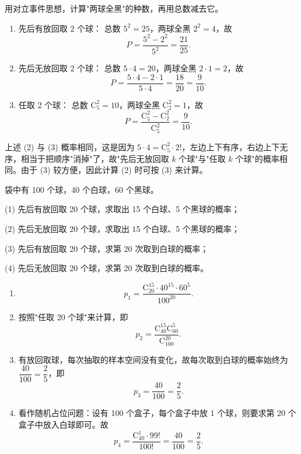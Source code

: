 \documentclass[lang=cn,11pt]{elegantbook}
\begin{document}
\begin{solution}
用对立事件思想，计算"两球全黑"的种数，再用总数减去它。
\begin{enumerate}
    \item 先后有放回取 2 个球：
    总数 \(5^2 = 25\)，两球全黑 \(2^2 = 4\)，故
    \[
    P = \frac{5^2 - 2^2}{5^2} = \frac{21}{25}.
    \]
    \item 先后无放回取 2 个球：
    总数 \(5 \cdot 4 = 20\)，两球全黑 \(2 \cdot 1 = 2\)，故
    \[
    P = \frac{5 \cdot 4 - 2 \cdot 1}{5 \cdot 4} = \frac{18}{20} = \frac{9}{10}.
    \]
    \item 任取 2 个球：
    总数 \(\mathrm{C}_5^2 = 10\)，两球全黑 \(\mathrm{C}_2^2 = 1\)，故
    \[
    P = \frac{\mathrm{C}_5^2 - \mathrm{C}_2^2}{\mathrm{C}_5^2} = \frac{9}{10}.
    \]
\end{enumerate}
\end{solution}

\begin{note}
上述 (2) 与 (3) 概率相同，这是因为 \(5 \cdot 4 = \mathrm{C}_5^2 \cdot 2!\)，左边上下有序，右边上下无序，相当于把顺序"消掉"了，故"先后无放回取 \(k\) 个球"与"任取 \(k\) 个球"的概率相同。由于 (3) 较方便，因此计算 (2) 时可按 (3) 来计算。
\end{note}

\begin{exercise}\label{exer:1-6}
袋中有 100 个球，40 个白球，60 个黑球。\par
(1) 先后有放回取 20 个球，求取出 15 个白球、5 个黑球的概率；\par
(2) 先后无放回取 20 个球，求取出 15 个白球、5 个黑球的概率；\par
(3) 先后有放回取 20 个球，求第 20 次取到白球的概率；\par
(4) 先后无放回取 20 个球，求第 20 次取到白球的概率。
\end{exercise}
\begin{solution}
\begin{enumerate}
    \item \[
    p_1 = \frac{\mathrm{C}_{20}^{15} \cdot 40^{15} \cdot 60^{5}}{100^{20}}.
    \]
    \item 按照"任取 20 个球"来计算，即
    \[
    p_2 = \frac{\mathrm{C}_{40}^{15} \mathrm{C}_{60}^{5}}{\mathrm{C}_{100}^{20}}.
    \]
    \item 有放回取球，每次抽取的样本空间没有变化，故每次取到白球的概率始终为 \(\dfrac{40}{100} = \dfrac{2}{5}\)，即
    \[
    p_3 = \frac{40}{100} = \frac{2}{5}.
    \]
    \item 看作随机占位问题：设有 100 个盒子，每个盒子中放 1 个球，则要求第 20 个盒子中放入白球即可。故
    \[
    p_4 = \frac{\mathrm{C}_{40}^1 \cdot 99!}{100!} = \frac{40}{100} = \frac{2}{5}.
    \]
\end{enumerate}
\end{solution}
\end{document}
